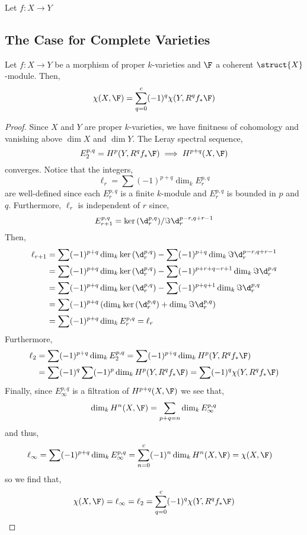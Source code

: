 \documentclass[12pt]{article}
\begin{document}
\begin{lemma}
Let $f : X \to Y$ 
\end{lemma}

\subsection{The Case for Complete Varieties}

\begin{lemma}
Let $f : X \to Y$ be a morphism of proper $k$-varieties and $\F$ a coherent $\struct{X}$-module. Then,
\[ \chi(X, \F) = \sum_{q = 0}^c (-1)^q \chi(Y, R^q f_* \F) \]
\end{lemma}

\begin{proof}
Since $X$ and $Y$ are proper $k$-varieties, we have finitness of cohomology and vanishing above $\dim{X}$ and $\dim{Y}$. The Leray spectral sequence,
\[ E^{p,q}_2 = H^p(Y, R^q f_* \F) \implies H^{p+q}(X, \F) \]
converges. Notice that the integers,
\[ \ell_r = \sum (-1)^{p + q} \dim_k E^{p,q}_r \]
are well-defined since each $E^{p,q}_r$ is a finite $k$-module and $E^{p,q}_r$ is bounded in $p$ and $q$. Furthermore, $\ell_r$ is independent of $r$ since,
\[ E^{p,q}_{r+1} = \ker{(\d_{r}^{p,q})} / \Im{\d_{r}^{p-r,q+r-1}} \]
Then,
\begin{align*}
\ell_{r+1} & = \sum (-1)^{p + q} \dim_k \ker{(\d_{r}^{p,q})} - \sum (-1)^{p + q} \dim_k \Im{\d_{r}^{p-r,q+r-1}} 
\\
& = \sum (-1)^{p + q} \dim_k \ker{(\d_{r}^{p,q})} - \sum (-1)^{p + r + q - r + 1} \dim_k \Im{\d_{r}^{p,q}}
\\ 
& = \sum (-1)^{p + q} \dim_k \ker{(\d_{r}^{p,q})} - \sum (-1)^{p + q + 1} \dim_k \Im{\d_{r}^{p,q}}
\\
& = \sum (-1)^{p + q} \left( \dim_k \ker{(\d_{r}^{p,q})} + \dim_k \Im{\d_{r}^{p,q}} \right) 
\\
& = \sum (-1)^{p + q} \dim_k E^{p,q}_r = \ell_r
\end{align*}
Furthermore,
\begin{align*}
\ell_2 & = \sum (-1)^{p+q} \dim_k E^{p,q}_2 = \sum (-1)^{p+q} \dim_k H^p(Y, R^q f_* \F)
\\
& = \sum (-1)^q \sum (-1)^p \dim_k H^p(Y, R^q f_* \F) = \sum (-1)^q \chi(Y, R^q f_* \F)
\end{align*}
Finally, since $E^{p,q}_\infty$ is a filtration of $H^{p+q}(X, \F)$ we see that,
\[ \dim_k H^{n}(X, \F) = \sum_{p + q = n} \dim_k E^{p,q}_\infty \]
and thus, 
\begin{align*}
\ell_{\infty} & = \sum (-1)^{p+q} \dim_k E^{p,q}_\infty = \sum_{n = 0}^c (-1)^n \dim_k H^{n}(X, \F) = \chi(X, \F)
\end{align*}
so we find that,
\[ \chi(X, \F) = \ell_\infty = \ell_2 = \sum_{q = 0}^c (-1)^q \chi(Y, R^q f_* \F) \]
\end{proof}
\end{document}
